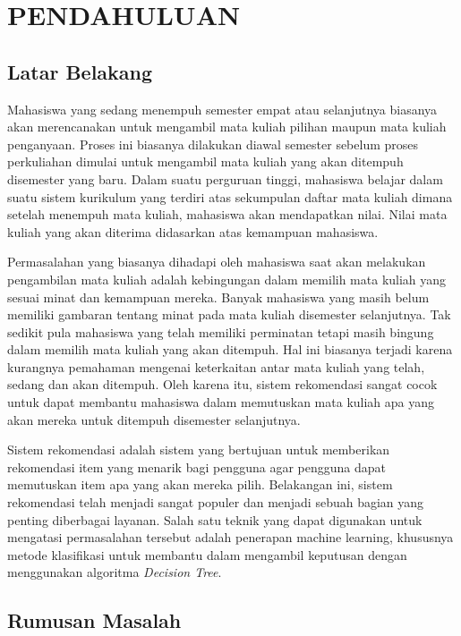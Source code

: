 \section{PENDAHULUAN}

\subsection{Latar Belakang}

Mahasiswa yang sedang menempuh semester empat atau selanjutnya biasanya akan merencanakan untuk mengambil
mata kuliah pilihan maupun mata kuliah penganyaan. Proses ini biasanya dilakukan diawal semester sebelum proses perkuliahan
dimulai untuk mengambil mata kuliah yang akan ditempuh disemester yang baru. Dalam suatu perguruan tinggi, mahasiswa belajar dalam suatu
sistem kurikulum yang terdiri atas sekumpulan daftar mata kuliah dimana setelah menempuh mata kuliah,
mahasiswa akan mendapatkan nilai. Nilai mata kuliah yang akan diterima didasarkan atas kemampuan
mahasiswa.

Permasalahan yang biasanya dihadapi oleh mahasiswa saat akan melakukan pengambilan mata kuliah adalah kebingungan dalam
memilih mata kuliah yang sesuai minat dan kemampuan mereka. Banyak mahasiswa yang masih belum memiliki gambaran tentang
minat pada mata kuliah disemester selanjutnya. Tak sedikit pula mahasiswa yang telah memiliki perminatan tetapi masih
bingung dalam memilih mata kuliah yang akan ditempuh. Hal ini biasanya terjadi karena kurangnya pemahaman mengenai
keterkaitan antar mata kuliah yang telah, sedang dan akan ditempuh. Oleh karena itu, sistem rekomendasi sangat cocok untuk
dapat membantu mahasiswa dalam memutuskan mata kuliah apa yang akan mereka untuk ditempuh disemester selanjutnya.

Sistem rekomendasi adalah sistem yang bertujuan untuk memberikan rekomendasi item yang menarik bagi pengguna agar pengguna
dapat memutuskan item apa yang akan mereka pilih. Belakangan ini, sistem rekomendasi telah menjadi sangat populer dan menjadi
sebuah bagian yang penting diberbagai layanan. Salah satu teknik yang dapat digunakan untuk mengatasi permasalahan tersebut adalah
penerapan machine learning, khususnya metode klasifikasi untuk membantu dalam mengambil keputusan dengan menggunakan algoritma
\emph{Decision Tree}.

\subsection{Rumusan Masalah}

